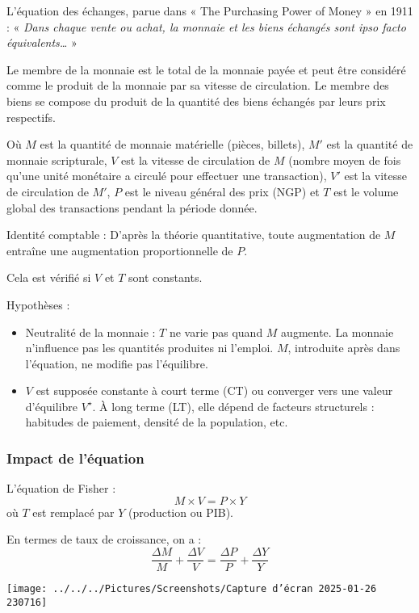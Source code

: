 \documentclass[a4paper, 12pt]{report}
\begin{document}
L'équation des échanges, parue dans « The Purchasing Power of Money » en 1911 :  
« \textit{Dans chaque vente ou achat, la monnaie et les biens échangés sont ipso facto équivalents… }»  
\begin{center}
	Le membre de la monnaie est le total de la monnaie payée et peut être considéré comme le produit de la monnaie par sa vitesse de circulation. Le membre des biens se compose du produit de la quantité des biens échangés par leurs prix respectifs.
\end{center}  

Où \( M \) est la quantité de monnaie matérielle (pièces, billets), \( M' \) est la quantité de monnaie scripturale, \( V \) est la vitesse de circulation de \( M \) (nombre moyen de fois qu'une unité monétaire a circulé pour effectuer une transaction), \( V' \) est la vitesse de circulation de \( M' \), \( P \) est le niveau général des prix (NGP) et \( T \) est le volume global des transactions pendant la période donnée.  

Identité comptable : D'après la théorie quantitative, toute augmentation de \( M \) entraîne une augmentation proportionnelle de \( P \).  

Cela est vérifié si \( V \) et \( T \) sont constants.  

Hypothèses :  
\begin{itemize}
	\item Neutralité de la monnaie : \( T \) ne varie pas quand \( M \) augmente. La monnaie n'influence pas les quantités produites ni l'emploi. \( M \), introduite après dans l'équation, ne modifie pas l'équilibre.
	\item \( V \) est supposée constante à court terme (CT) ou converger vers une valeur d'équilibre \( V^\star \). À long terme (LT), elle dépend de facteurs structurels : habitudes de paiement, densité de la population, etc.
\end{itemize}
	
\subsubsection{Impact de l'équation}

L'équation de Fisher :  
\[
M \times V = P \times Y
\]
où \( T \) est remplacé par \( Y \) (production ou PIB).  

En termes de taux de croissance, on a :  
\[
\frac{\Delta M}{M} + \frac{\Delta V}{V} = \frac{\Delta P}{P} + \frac{\Delta Y}{Y}
\]

\begin{center}
	\texttt{[image: ../../../Pictures/Screenshots/Capture d'écran 2025-01-26 230716]}
\end{center}
	
\end{document}
